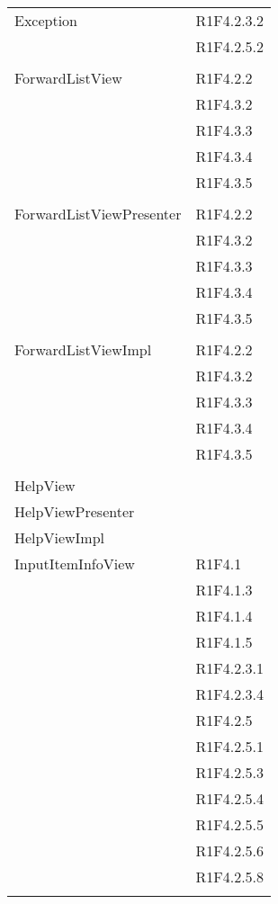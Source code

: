 \begin{center}
\begin{longtable}{|p{7cm}|p{5cm}|}
		Exception & R1F4.2.3.2 \\ & R1F4.2.5.2 \\ & \\ \hline
		ForwardListView & R1F4.2.2 \\ & R1F4.3.2 \\ & R1F4.3.3 \\ & R1F4.3.4 \\ & R1F4.3.5 \\ & \\ \hline
		ForwardListViewPresenter & R1F4.2.2 \\ & R1F4.3.2 \\ & R1F4.3.3 \\ & R1F4.3.4 \\ & R1F4.3.5 \\ & \\ \hline
		ForwardListViewImpl & R1F4.2.2 \\ & R1F4.3.2 \\ & R1F4.3.3 \\ & R1F4.3.4 \\ & R1F4.3.5 \\ & \\ \hline
		HelpView & \\ \hline
		HelpViewPresenter & \\ \hline
		HelpViewImpl & \\ \hline
		InputItemInfoView & R1F4.1 \\ & R1F4.1.3 \\ & R1F4.1.4 \\ & R1F4.1.5 \\ & R1F4.2.3.1 \\ & R1F4.2.3.4 \\ & R1F4.2.5 \\ & R1F4.2.5.1 \\ & R1F4.2.5.3 \\ & R1F4.2.5.4 \\ & R1F4.2.5.5 \\ & R1F4.2.5.6 \\ & R1F4.2.5.8 \\ & \\ \hline

\end{longtable}
\end{center}
